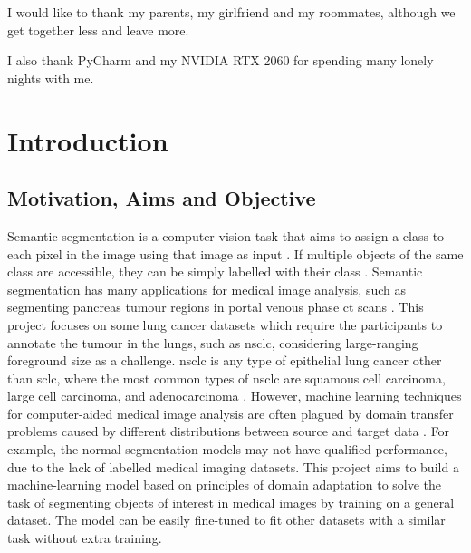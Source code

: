 \documentclass[11pt,times,oneside,openright]{eeereport}
\begin{document}
I would like to thank my parents, my girlfriend and my roommates, although we get together less and leave more.

I also thank PyCharm and my NVIDIA RTX 2060 for spending many lonely nights with me.

\mainmatter
{}

\chapter{Introduction}\label{cpt:intro}

\section{Motivation, Aims and Objective}
Semantic segmentation is a computer vision task that aims to assign a class to each pixel in the image using that image as input \cite{asgari2021deep}. If multiple objects of the same class are accessible, they can be simply labelled with their class \cite{asgari2021deep}. Semantic segmentation has many applications for medical image analysis, such as segmenting pancreas tumour regions in portal venous phase \acrfull{ct} scans \cite{asgari2021deep}. This project focuses on some lung cancer datasets which require the participants to annotate the tumour in the lungs, such as \acrfull{nsclc}, considering large-ranging foreground size as a challenge. \acrshort{nsclc} is any type of epithelial lung cancer other than \acrfull{sclc}, where the most common types of \acrshort{nsclc} are squamous cell carcinoma, large cell carcinoma, and adenocarcinoma \cite{duma2019non, goldstraw2011non}. However, machine learning techniques for computer-aided medical image analysis are often plagued by domain transfer problems caused by different distributions between source and target data \cite{guan2021domain}. For example, the normal segmentation models may not have qualified performance, due to the lack of labelled medical imaging datasets. This project aims to build a machine-learning model based on principles of domain adaptation to solve the task of segmenting objects of interest in medical images by training on a general dataset. The model can be easily fine-tuned to fit other datasets with a similar task without extra training.
\end{document}
